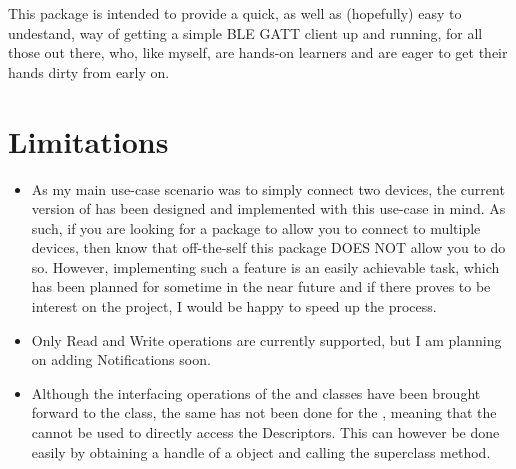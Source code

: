 \documentclass[letterpaper,10pt,english]{sphinxmanual}
\begin{document}
This package is intended to provide a quick, as well as (hopefully) easy to undestand, way of getting a simple BLE GATT client up and running, for all those out there, who, like myself, are hands-on learners and are eager to get their hands dirty from early on.


\section{Limitations}
\label{\detokenize{intro:limitations}}\begin{itemize}
\item {} 
As my main use-case scenario was to simply connect two devices, the current version of {\hyperref[\detokenize{PandaBot:PandaBot.PandaBotClient}]{}} has been designed and implemented with this use-case in mind. As such, if you are looking for a package to allow you to connect to multiple devices, then know that off-the-self this package DOES NOT allow you to do so. However, implementing such a feature is an easily achievable task, which has been planned for sometime in the near future and if there proves to be interest on the project, I would be happy to speed up the process.

\item {} 
Only Read and Write operations are currently supported, but I am planning on adding Notifications soon.

\item {} 
Although the interfacing operations of the  and  classes have been brought forward to the {\hyperref[\detokenize{PandaBot:PandaBot.PandaBotClient}]{}} class, the same has not been done for the , meaning that the {\hyperref[\detokenize{PandaBot:PandaBot.PandaBotClient}]{}} cannot be used to directly access the Descriptors. This can however be done easily by obtaining a handle of a {\hyperref[\detokenize{PandaBot:PandaBot.PandaBotDevice}]{}} object and calling the superclass  method.

\end{itemize}
\end{document}
